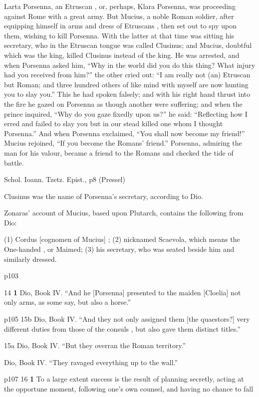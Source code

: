 Larta Porsenna, an Etruscan , or, perhaps, Klara Porsenna, was proceeding against Rome with a great army. But Mucius, a noble Roman soldier, after equipping himself in arms and dress of Etruscans , then set out to spy upon them, wishing to kill Porsenna. With the latter at that time was sitting his secretary, who in the Etruscan tongue was called Clusinus; and Mucius, doubtful which was the king, killed Clusinus instead of the king. He was arrested, and when Porsenna asked him, ``Why in the world did you do this thing? What injury had you received from him?'' the other cried out: ``I am really not (an) Etruscan but Roman; and three hundred others of like mind with myself are now hunting you to slay you.'' This he had spoken falsely; and with his right hand thrust into the fire he gazed on Porsenna as though another were suffering; and when the prince inquired, ``Why do you gaze fixedly upon us?'' he said: ``Reflecting how I erred and failed to slay you but in our stead killed one whom I thought Porsenna.'' And when Porsenna exclaimed, ``You shall now become my friend!'' Mucius rejoined, ``If you become the Romans' friend.'' Porsenna, admiring the man for his valour, became a friend to the Romans and checked the tide of battle.

Schol. Ioann. Tzetz. Epist., p8 (Pressel)

Clusinus was the name of Porsenna's secretary, according to Dio.

Zonaras' account of Mucius, based upon Plutarch, contains the following from Dio:

(1) Cordus [cognomen of Mucius] ; (2) nicknamed Scaevola, which means the One-handed , or Maimed; (3) his secretary, who was seated beside him and similarly dressed.

p103

14
\textbf{1} Dio, Book IV. ``And he [Porsenna] presented to the maiden [Cloelia] not only arms, as some say, but also a horse.''

p105
15b
Dio, Book IV. ``And they not only assigned them [the quaestors?] very different duties from those of the consuls , but also gave them distinct titles.''

15a
Dio, Book IV. ``But they overran the Roman territory.''

Dio, Book IV. ``They ravaged everything up to the wall.''

p107
16
\textbf{1} To a large extent success is the result of planning secretly, acting at the opportune moment, following one's own counsel, and having no chance to fall

